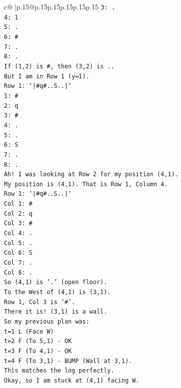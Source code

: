 \documentclass{article}
\begin{document}
{\begin{supertabular}{c@{$\;$}|p{.15\linewidth}@{}p{.15\linewidth}p{.15\linewidth}p{.15\linewidth}p{.15\linewidth}p{.15\linewidth}}
{{{\texttt{3: .} \\
\texttt{4: 1} \\
\texttt{5: .} \\
\texttt{6: \#} \\
\texttt{7: .} \\
\texttt{8: .} \\
\texttt{If (1,2) is \#, then (3,2) is ..} \\
\texttt{But I am in Row 1 (y=1).} \\
\texttt{Row 1: `|\#q\#..S..|`} \\
\texttt{1: \#} \\
\texttt{2: q} \\
\texttt{3: \#} \\
\texttt{4: .} \\
\texttt{5: .} \\
\texttt{6: S} \\
\texttt{7: .} \\
\texttt{8: .} \\
\texttt{Ah! I was looking at Row 2 for my position (4,1).} \\
\texttt{My position is (4,1). That is Row 1, Column 4.} \\
\texttt{Row 1: `|\#q\#..S..|`} \\
\texttt{Col 1: \#} \\
\texttt{Col 2: q} \\
\texttt{Col 3: \#} \\
\texttt{Col 4: .} \\
\texttt{Col 5: .} \\
\texttt{Col 6: S} \\
\texttt{Col 7: .} \\
\texttt{Col 8: .} \\
\texttt{So (4,1) is '.' (open floor).} \\
\texttt{To the West of (4,1) is (3,1).} \\
\texttt{Row 1, Col 3 is '\#'.} \\
\texttt{There it is! (3,1) is a wall.} \\
\texttt{So my previous plan was:} \\
\texttt{t=1 L (Face W)} \\
\texttt{t=2 F (To 5,1) {-} OK} \\
\texttt{t=3 F (To 4,1) {-} OK} \\
\texttt{t=4 F (To 3,1) {-} BUMP (Wall at 3,1).} \\
\texttt{This matches the log perfectly.} \\
\texttt{Okay, so I am stuck at (4,1) facing W.} \\
}}}
\end{supertabular}}
\end{document}
